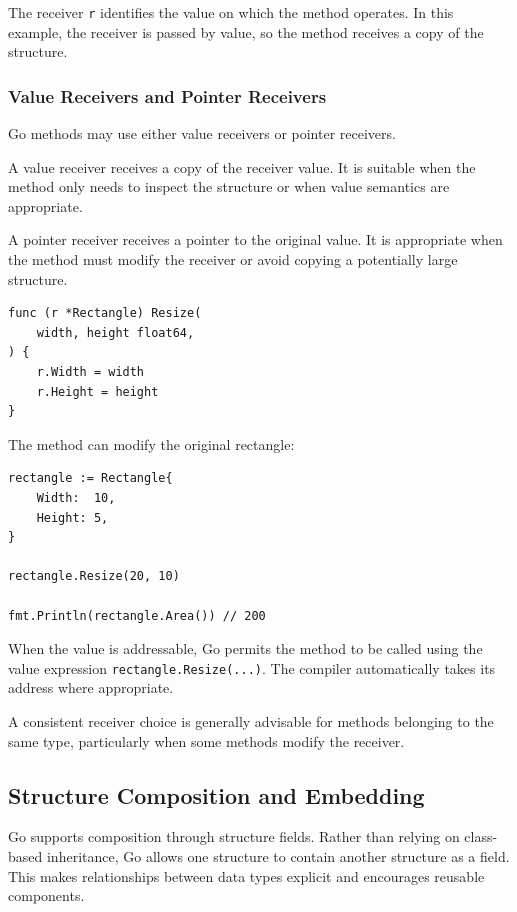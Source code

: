 The receiver \texttt{r} identifies the value on which the method operates. In this example, the receiver is passed by value, so the method receives a copy of the structure.

\subsubsection{Value Receivers and Pointer Receivers}

Go methods may use either value receivers or pointer receivers.

A value receiver receives a copy of the receiver value. It is suitable when the method only needs to inspect the structure or when value semantics are appropriate.

A pointer receiver receives a pointer to the original value. It is appropriate when the method must modify the receiver or avoid copying a potentially large structure.

\begin{lstlisting}
func (r *Rectangle) Resize(
    width, height float64,
) {
    r.Width = width
    r.Height = height
}
\end{lstlisting}

The method can modify the original rectangle:

\begin{lstlisting}
rectangle := Rectangle{
    Width:  10,
    Height: 5,
}

rectangle.Resize(20, 10)

fmt.Println(rectangle.Area()) // 200
\end{lstlisting}

When the value is addressable, Go permits the method to be called using the value expression \texttt{rectangle.Resize(...)}. The compiler automatically takes its address where appropriate.

A consistent receiver choice is generally advisable for methods belonging to the same type, particularly when some methods modify the receiver.

\subsection{Structure Composition and Embedding}

Go supports composition through structure fields. Rather than relying on class-based inheritance, Go allows one structure to contain another structure as a field. This makes relationships between data types explicit and encourages reusable components.


